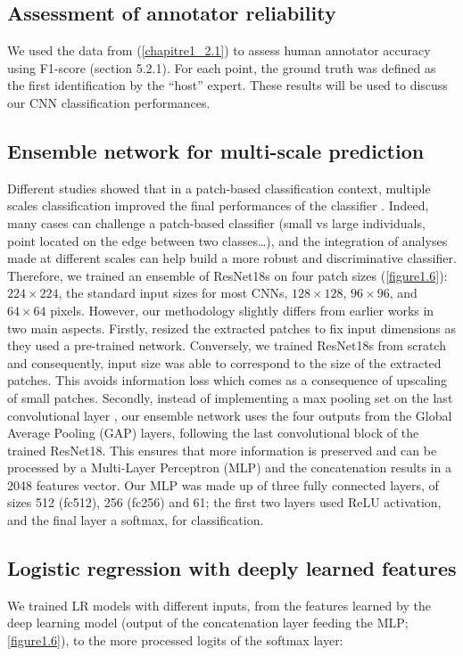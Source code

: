 \subsection{Assessment of annotator reliability}\label{chapitre1_4.1}
We used the data from \citet{beijbom_towards_2015} (\autoref{chapitre1_2.1}) to assess human annotator accuracy using F1-score (section 5.2.1). For each point, the ground truth was defined as the first identification by the “host” expert. These results will be used to discuss our CNN classification performances.

\subsection{Ensemble network for multi-scale prediction}\label{chapitre1_4.2}
Different studies showed that in a patch-based classification context, multiple scales classification improved the final performances of the classifier \citep{beijbom_automated_2012, mahmood_coral_2016}. Indeed, many cases can challenge a patch-based classifier (small vs large individuals, point located on the edge between two classes…), and the integration of analyses made at different scales can help build a more robust and discriminative classifier. Therefore, we trained an ensemble of ResNet18s on four patch sizes (\autoref{figure1.6}): \(224 \times 224\), the standard input sizes for most CNNs, \(128 \times 128\), \(96 \times 96\), and \(64 \times 64\) pixels. However, our methodology slightly differs from earlier works in two main aspects. Firstly, \citet{mahmood_coral_2016} resized the extracted patches to fix input dimensions as they used a pre-trained network. Conversely, we trained ResNet18s from scratch and consequently, input size was able to correspond to the size of the extracted patches. This avoids information loss which comes as a consequence of upscaling of small patches. Secondly, instead of implementing a max pooling set on the last convolutional layer \citep{mahmood_coral_2016}, our ensemble network uses the four outputs from the Global Average Pooling (GAP) layers, following the last convolutional block of the trained ResNet18. This ensures that more information is preserved and can be processed by a Multi-Layer Perceptron (MLP) and the concatenation results in a 2048 features vector. Our MLP was made up of three fully connected layers, of sizes 512 (fc512), 256 (fc256) and 61; the first two layers used ReLU activation, and the final layer a softmax, for classification.


\subsection{Logistic regression with deeply learned features}\label{chapitre1_4.3}
We trained LR models with different inputs, from the features learned by the deep learning model (output of the concatenation layer feeding the MLP; \autoref{figure1.6}), to the more processed logits of the softmax layer:

